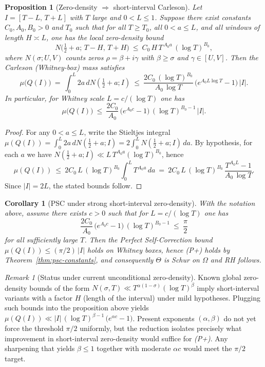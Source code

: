 \documentclass[11pt]{article}
\newtheorem{proposition}[theorem]{Proposition}
\newtheorem{corollary}[theorem]{Corollary}
\theoremstyle{remark}
\newtheorem{remark}[theorem]{Remark}
\begin{document}
\begin{proposition}[Zero-density \(\Rightarrow\) short-interval Carleson]
Let \(I=[T-L,\,T+L]\) with \(T\) large and \(0<L\le 1\). Suppose there exist constants \(C_0,A_0,B_0>0\) and \(T_0\) such that for all \(T\ge T_0\), all \(0<a\le L\), and all windows of length \(H\asymp L\), one has the local zero-density bound
\[
 N\big(\tfrac12+a;\,T-H,\,T+H\big)\ \le\ C_0\,H\,T^{\,A_0 a}\,(\log T)^{B_0},
\]
where \(N(\sigma;U,V)\) counts zeros \(\rho=\beta+i\gamma\) with \(\beta\ge \sigma\) and \(\gamma\in[U,V]\). Then the Carleson (Whitney-box) mass satisfies
\[
 \mu\big(Q(I)\big)\ =\ \int_{0}^{L}\!2a\,dN(\tfrac12+a;I)\ \le\ \frac{2C_0\,(\log T)^{B_0}}{A_0\,\log T}\,\big(e^{A_0 L\log T}-1\big)\,|I|.
\]
In particular, for Whitney scale \(L=c/(\log T)\) one has
\[
 \mu\big(Q(I)\big)\ \le\ \frac{2C_0}{A_0}\,\big(e^{A_0 c}-1\big)\,(\log T)^{B_0-1}\,|I|.
\]
\end{proposition}
\begin{proof}
For any \(0<a\le L\), write the Stieltjes integral
\(\mu(Q(I))=\int_0^L\!2a\,dN(\tfrac12+a;I)=2\int_0^L N(\tfrac12+a;I)\,da\). By hypothesis, for each \(a\) we have \(N(\tfrac12+a;I)\ll L\,T^{A_0 a}(\log T)^{B_0}\), hence
\[
 \mu(Q(I))\ \le\ 2C_0\,L\,(\log T)^{B_0}\int_0^L T^{A_0 a}\,da
 \ =\ 2C_0\,L\,(\log T)^{B_0}\,\frac{T^{A_0 L}-1}{A_0\,\log T}.
\]
Since \(|I|=2L\), the stated bounds follow.\qedhere
\end{proof}

\begin{corollary}[PSC under strong short-interval zero-density]
With the notation above, assume there exists \(c>0\) such that for \(L=c/(\log T)\) one has
\[
 \frac{2C_0}{A_0}\,\big(e^{A_0 c}-1\big)\,(\log T)^{B_0-1}\ \le\ \frac{\pi}{2}
\]
for all sufficiently large \(T\). Then the Perfect Self-Correction bound \(\mu(Q(I))\le (\pi/2)\,|I|\) holds on Whitney boxes, hence \emph{(P+)} holds by Theorem~\ref{thm:psc-constants}, and consequently \(\Theta\) is Schur on \(\Omega\) and \emph{RH} follows.
\end{corollary}

\begin{remark}[Status under current unconditional zero-density]
Known global zero-density bounds of the form \(N(\sigma,T)\ll T^{\alpha(1-\sigma)}(\log T)^{\beta}\) imply short-interval variants with a factor \(H\) (length of the interval) under mild hypotheses. Plugging such bounds into the proposition above yields
\(\mu(Q(I))\ll |I|\,(\log T)^{\beta-1}\,\big(e^{\alpha c}-1\big)\). Present exponents \((\alpha,\beta)\) do not yet force the threshold \(\pi/2\) uniformly, but the reduction isolates precisely what improvement in short-interval zero-density would suffice for \emph{(P+)}. Any sharpening that yields \(\beta\le 1\) together with moderate \(\alpha c\) would meet the \(\pi/2\) target.
\end{remark}
\end{document}

